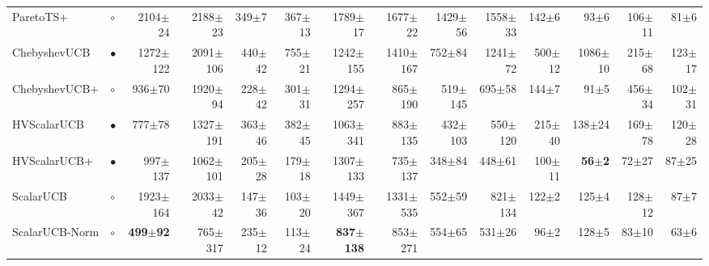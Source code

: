 \begin{tabular}{llrrrrrrrrrrrr}
ParetoTS+ & $\circ$ & 2104{\scriptsize$\pm$24} & 2188{\scriptsize$\pm$23} & 349{\scriptsize$\pm$7} & 367{\scriptsize$\pm$13} & 1789{\scriptsize$\pm$17} & 1677{\scriptsize$\pm$22} & 1429{\scriptsize$\pm$56} & 1558{\scriptsize$\pm$33} & 142{\scriptsize$\pm$6} & 93{\scriptsize$\pm$6} & 106{\scriptsize$\pm$11} & 81{\scriptsize$\pm$6}\\
ChebyshevUCB & $\bullet$ & 1272{\scriptsize$\pm$122} & 2091{\scriptsize$\pm$106} & 440{\scriptsize$\pm$42} & 755{\scriptsize$\pm$21} & 1242{\scriptsize$\pm$155} & 1410{\scriptsize$\pm$167} & 752{\scriptsize$\pm$84} & 1241{\scriptsize$\pm$72} & 500{\scriptsize$\pm$12} & 1086{\scriptsize$\pm$10} & 215{\scriptsize$\pm$68} & 123{\scriptsize$\pm$17}\\
ChebyshevUCB+ & $\circ$ & 936{\scriptsize$\pm$70} & 1920{\scriptsize$\pm$94} & 228{\scriptsize$\pm$42} & 301{\scriptsize$\pm$31} & 1294{\scriptsize$\pm$257} & 865{\scriptsize$\pm$190} & 519{\scriptsize$\pm$145} & 695{\scriptsize$\pm$58} & 144{\scriptsize$\pm$7} & 91{\scriptsize$\pm$5} & 456{\scriptsize$\pm$34} & 102{\scriptsize$\pm$31}\\
HVScalarUCB & $\bullet$ & 777{\scriptsize$\pm$78} & 1327{\scriptsize$\pm$191} & 363{\scriptsize$\pm$46} & 382{\scriptsize$\pm$45} & 1063{\scriptsize$\pm$341} & 883{\scriptsize$\pm$135} & 432{\scriptsize$\pm$103} & 550{\scriptsize$\pm$120} & 215{\scriptsize$\pm$40} & 138{\scriptsize$\pm$24} & 169{\scriptsize$\pm$78} & 120{\scriptsize$\pm$28}\\
HVScalarUCB+ & $\bullet$ & 997{\scriptsize$\pm$137} & 1062{\scriptsize$\pm$101} & 205{\scriptsize$\pm$28} & 179{\scriptsize$\pm$18} & 1307{\scriptsize$\pm$133} & 735{\scriptsize$\pm$137} & 348{\scriptsize$\pm$84} & 448{\scriptsize$\pm$61} & 100{\scriptsize$\pm$11} & \textbf{56{\scriptsize$\pm$2}} & 72{\scriptsize$\pm$27} & 87{\scriptsize$\pm$25}\\
ScalarUCB & $\circ$ & 1923{\scriptsize$\pm$164} & 2033{\scriptsize$\pm$42} & 147{\scriptsize$\pm$36} & 103{\scriptsize$\pm$20} & 1449{\scriptsize$\pm$367} & 1331{\scriptsize$\pm$535} & 552{\scriptsize$\pm$59} & 821{\scriptsize$\pm$134} & 122{\scriptsize$\pm$2} & 125{\scriptsize$\pm$4} & 128{\scriptsize$\pm$12} & 87{\scriptsize$\pm$7}\\
ScalarUCB-Norm & $\circ$ & \textbf{499{\scriptsize$\pm$92}} & 765{\scriptsize$\pm$317} & 235{\scriptsize$\pm$12} & 113{\scriptsize$\pm$24} & \textbf{837{\scriptsize$\pm$138}} & 853{\scriptsize$\pm$271} & 554{\scriptsize$\pm$65} & 531{\scriptsize$\pm$26} & 96{\scriptsize$\pm$2} & 128{\scriptsize$\pm$5} & 83{\scriptsize$\pm$10} & 63{\scriptsize$\pm$6}\\

\end{tabular}
